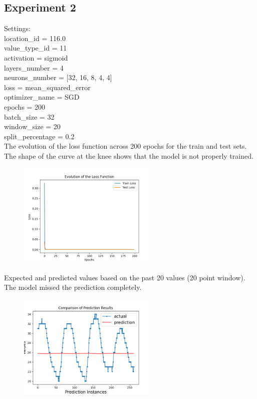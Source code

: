 \documentclass{foxelas_report}
\begin{document}
\subsection{Experiment 2}

Settings:\\
location\_id = 116.0\\
value\_type\_id = 11\\
activation = sigmoid\\
layers\_number = 4\\
neurons\_number = [32, 16, 8, 4, 4]\\
loss = mean\_squared\_error\\
optimizer\_name = SGD\\
epochs = 200\\
batch\_size = 32\\
window\_size = 20\\
split\_percentage = 0.2\\



The evolution of the loss function across 200 epochs for the train and test sets. The shape of the curve at the knee shows that the model is not properly trained.

\begin{figure}[H]
\includegraphics[width=0.6\textwidth]{case2_model_loss.png}
\end{figure}

Expected and predicted values based on the past 20 values (20 point window). The model missed the prediction completely.

\begin{figure}[H]
\includegraphics[width=0.6\textwidth]{case2_predictions.png}
\end{figure}
\end{document}
